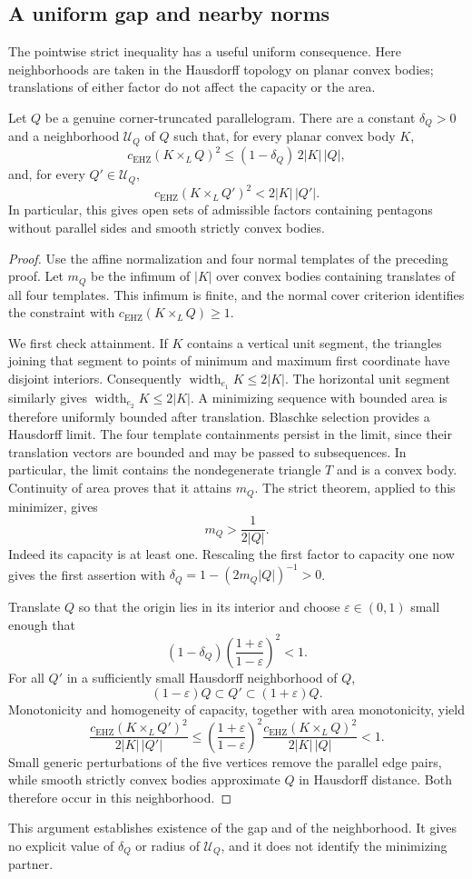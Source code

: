 \subsection{A uniform gap and nearby norms}

The pointwise strict inequality has a useful uniform consequence.  Here
neighborhoods are taken in the Hausdorff topology on planar convex bodies;
translations of either factor do not affect the capacity or the area.

\begin{corollary}\label{cor:truncated-neighborhood}
Let $Q$ be a genuine corner-truncated parallelogram.  There are a constant
$\delta_Q>0$ and a neighborhood $\mathcal U_Q$ of $Q$ such that, for every
planar convex body $K$,
\[
 c_{\mathrm{EHZ}}(K\times_L Q)^2
 \le (1-\delta_Q)\,2|K|\,|Q|,
\]
and, for every $Q'\in\mathcal U_Q$,
\[
 c_{\mathrm{EHZ}}(K\times_L Q')^2<2|K|\,|Q'|.
\]
In particular, this gives open sets of admissible factors containing
pentagons without parallel sides and smooth strictly convex bodies.
\end{corollary}

\begin{proof}
Use the affine normalization and four normal templates of the preceding
proof.  Let $m_Q$ be the infimum of $|K|$ over convex bodies containing
translates of all four templates.  This infimum is finite, and the normal
cover criterion identifies the constraint with
$c_{\mathrm{EHZ}}(K\times_L Q)\ge1$.

We first check attainment.  If $K$ contains a vertical unit segment, the
triangles joining that segment to points of minimum and maximum first
coordinate have disjoint interiors.  Consequently
$\operatorname{width}_{e_1}K\le2|K|$.  The horizontal unit segment similarly
gives $\operatorname{width}_{e_2}K\le2|K|$.  A minimizing sequence with bounded
area is therefore uniformly bounded after translation.  Blaschke selection
provides a Hausdorff limit.  The four template containments persist in the
limit, since their translation vectors are bounded and may be passed to
subsequences.  In particular, the limit contains the nondegenerate triangle
$T$ and is a convex body.  Continuity of area proves that it attains $m_Q$.
The strict theorem, applied to this minimizer, gives
\[
 m_Q>\frac1{2|Q|}.
\]
Indeed its capacity is at least one.  Rescaling the first factor to capacity
one now gives the first assertion with
$\delta_Q=1-(2m_Q|Q|)^{-1}>0$.

Translate $Q$ so that the origin lies in its interior and choose
$\varepsilon\in(0,1)$ small enough that
\[
 (1-\delta_Q)\left(\frac{1+\varepsilon}{1-\varepsilon}\right)^2<1.
\]
For all $Q'$ in a sufficiently small Hausdorff neighborhood of $Q$,
\[
 (1-\varepsilon)Q\subset Q'\subset(1+\varepsilon)Q.
\]
Monotonicity and homogeneity of capacity, together with area monotonicity,
yield
\[
 \frac{c_{\mathrm{EHZ}}(K\times_L Q')^2}{2|K|\,|Q'|}
 \le
 \left(\frac{1+\varepsilon}{1-\varepsilon}\right)^2
 \frac{c_{\mathrm{EHZ}}(K\times_L Q)^2}{2|K|\,|Q|}
 <1.
\]
Small generic perturbations of the five vertices remove the parallel edge
pairs, while smooth strictly convex bodies approximate $Q$ in Hausdorff
distance.  Both therefore occur in this neighborhood.
\end{proof}

\begin{remark}
This argument establishes existence of the gap and of the neighborhood.
It gives no explicit value of $\delta_Q$ or radius of $\mathcal U_Q$, and it
does not identify the minimizing partner.
\end{remark}
